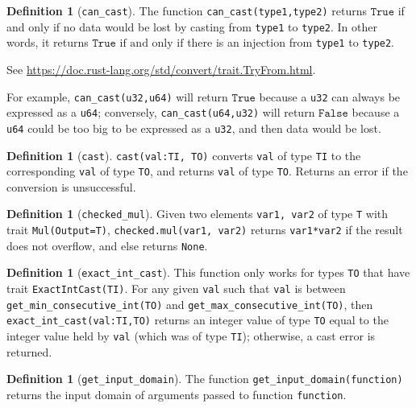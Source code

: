 \documentclass[11pt,a4paper]{article}
\theoremstyle{definition}
\newtheorem{definition}[theorem]{Definition}
\newcommand{\True}{\texttt{True}}
\newcommand{\False}{\texttt{False}}
\newcommand{\inRust}[2]{See \url{#2}.}
\newcommand{\iffText}{\text{if and only if}}
\begin{document}
\begin{definition}[\texttt{can\_cast}]
    The function \texttt{can\_cast(type1,type2)} returns $\True$ if and only if no data would be lost by casting from \texttt{type1} to \texttt{type2}. In other words, it returns $\True$ $\iffText$ there is an injection from \texttt{type1} to \texttt{type2}. 
    
    \inRust{std::convert::TryFrom}{https://doc.rust-lang.org/std/convert/trait.TryFrom.html}
\end{definition}

For example, \texttt{can\_cast(u32,u64)} will return $\True$ because a \texttt{u32} can always be expressed as a \texttt{u64}; conversely, \texttt{can\_cast(u64,u32)} will return $\False$ because a \texttt{u64} could be too big to be expressed as a \texttt{u32}, and then data would be lost.

\begin{definition}[\texttt{cast}]
    \texttt{cast(val:TI, TO)} converts \texttt{val} of type \texttt{TI} to the corresponding \texttt{val} of type \texttt{TO}, and returns \texttt{val} of type \texttt{TO}. Returns an error if the conversion is unsuccessful.
\end{definition}

\begin{definition}[\texttt{checked\_mul}]
     Given two elements \texttt{var1, var2} of type \texttt{T} with trait \texttt{Mul(Output=T)}, \texttt{checked.mul(var1, var2)} returns \texttt{var1*var2} if the result does not overflow, and else returns \texttt{None}.
\end{definition}


\begin{definition}[\texttt{exact\_int\_cast}]
    This function only works for types \texttt{TO} that have trait \texttt{ExactIntCast(TI)}. For any given \texttt{val} such that \texttt{val} is between \texttt{get\_min\_consecutive\_int(TO)} and \texttt{get\_max\_consecutive\_int(TO)}, then \texttt{exact\_int\_cast(val:TI,TO)} returns an integer value of type \texttt{TO} equal to the integer value held by  \texttt{val} (which was of type \texttt{TI}); otherwise, a cast error is returned.
\end{definition}

\begin{definition}[\texttt{get\_input\_domain}]
    The function \texttt{get\_input\_domain(function)} returns the input domain of arguments passed to function \texttt{function}.
\end{definition}
\end{document}
